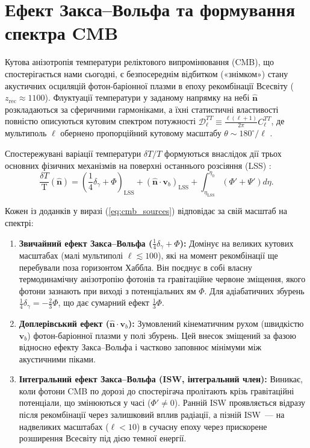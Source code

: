 \documentclass[12pt, a4paper]{article}
\begin{document}
\section{Ефект Закса--Вольфа та формування спектра CMB}
\label{sec:sachs}

Кутова анізотропія температури реліктового випромінювання (CMB), що спостерігається нами сьогодні, є безпосереднім відбитком («знімком») стану акустичних осциляцій фотон-баріонної плазми в епоху рекомбінації Всесвіту ($z_{\mathrm{rec}} \approx 1100$). Флуктуації температури у заданому напрямку на небі $\hat{\mathbf{n}}$ розкладаються за сферичними гармоніками, а їхні статистичні властивості повністю описуються кутовим спектром потужності $\mathcal{D}_\ell^{TT} \equiv \frac{\ell(\ell+1)}{2\pi}C_\ell^{TT}$, де мультиполь $\ell$ обернено пропорційний кутовому масштабу $\theta \sim 180^\circ / \ell$ \cite{dodelson_2020}.

Спостережувані варіації температури $\delta T / T$ формуються внаслідок дії трьох основних фізичних механізмів на поверхні останнього розсіяння (LSS) \cite{hu_sugiyama_1995}:
\begin{equation}\label{eq:cmb_sources}
  \frac{\delta T}{\text{T}}(\hat{\mathbf{n}}) = \left( \frac{1}{4}\delta_\gamma + \Phi \right)_{\mathrm{LSS}} + \left( \hat{\mathbf{n}} \cdot \mathbf{v}_b \right)_{\mathrm{LSS}} + \int_{\eta_{\mathrm{LSS}}}^{\eta_0} \left( \Phi' + \Psi' \right) d\eta.
\end{equation}

Кожен із доданків у виразі (\ref{eq:cmb_sources}) відповідає за свій масштаб на спектрі:
\begin{enumerate}
  \item \textbf{Звичайний ефект Закса--Вольфа ($\frac{1}{4}\delta_\gamma + \Phi$):} Домінує на великих кутових масштабах (малі мультиполі $\ell \lesssim 100$), які на момент рекомбінації ще перебували поза горизонтом Хаббла. Він поєднує в собі власну термодинамічну анізотропію фотонів та гравітаційне червоне зміщення, якого фотони зазнають при виході з потенціальних ям $\Phi$. Для адіабатичних збурень $\frac{1}{4}\delta_\gamma = -\frac{2}{3}\Phi$, що дає сумарний ефект $\frac{1}{3}\Phi$.
  \item \textbf{Доплерівський ефект ($\hat{\mathbf{n}} \cdot \mathbf{v}_b$):} Зумовлений кінематичним рухом (швидкістю $\mathbf{v}_b$) фотон-баріонної плазми у полі збурень. Цей внесок зміщений за фазою відносно ефекту Закса--Вольфа і частково заповнює мінімуми між акустичними піками.
  \item \textbf{Інтегральний ефект Закса--Вольфа (ISW, інтегральний член):} Виникає, коли фотони CMB по дорозі до спостерігача пролітають крізь гравітаційні потенціали, що змінюються у часі ($\Phi' \neq 0$). Ранній ISW проявляється відразу після рекомбінації через залишковий вплив радіації, а пізній ISW~--- на надвеликих масштабах ($\ell < 10$) в сучасну епоху через прискорене розширення Всесвіту під дією темної енергії.
\end{enumerate}
\end{document}
